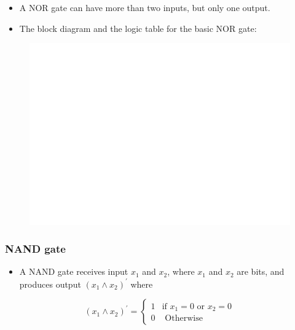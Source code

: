 \documentclass[]{book}
\providecommand{\tightlist}{%
  \setlength{\itemsep}{0pt}\setlength{\parskip}{0pt}}
\begin{document}
\begin{itemize}
\tightlist
\item
  A NOR gate can have more than two inputs, but only one output.
\item
  The block diagram and the logic table for the basic NOR gate:
\end{itemize}

\begin{figure}

{\centering \includegraphics[width=1\linewidth]{figure/boxC44-1} 

}

\end{figure}

\hypertarget{nand-gate}{%
\subsubsection{NAND gate}\label{nand-gate}}

\begin{itemize}
\tightlist
\item
  A NAND gate receives input \(x_1\) and \(x_2\), where \(x_1\) and \(x_2\) are bits, and produces output \((x_1 \land x_2)^\prime\) where
\end{itemize}

\begin{equation}
(x_1 \land x_2)^\prime =
\begin{cases} 
1 & \text{if } x_1 =0 \text{ or } x_2=0\\
0 & \text{ Otherwise }
\end{cases}
\end{equation}
\end{document}
